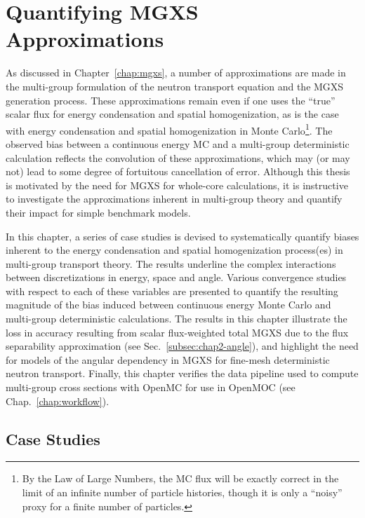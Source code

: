 \chapter{Quantifying MGXS Approximations}
\label{chap:biases}

As discussed in Chapter~\ref{chap:mgxs}, a number of approximations are made in the multi-group formulation of the neutron transport equation and the \ac{MGXS} generation process. These approximations remain even if one uses the ``true'' scalar flux for energy condensation and spatial homogenization, as is the case with energy condensation and spatial homogenization in Monte Carlo\footnote{By the Law of Large Numbers, the \ac{MC} flux will be exactly correct in the limit of an infinite number of particle histories, though it is only a ``noisy'' proxy for a finite number of particles.}. The observed bias between a continuous energy \ac{MC} and a multi-group deterministic calculation reflects the convolution of these approximations, which may (or may not) lead to some degree of fortuitous cancellation of error. Although this thesis is motivated by the need for \ac{MGXS} for whole-core calculations, it is instructive to investigate the approximations inherent in multi-group theory and quantify their impact for simple benchmark models.

In this chapter, a series of case studies is devised to systematically quantify biases inherent to the energy condensation and spatial homogenization process(es) in multi-group transport theory. The results underline the complex interactions between discretizations in energy, space and angle. Various convergence studies with respect to each of these variables are presented to quantify the resulting magnitude of the bias induced between continuous energy Monte Carlo and multi-group deterministic calculations. The results in this chapter illustrate the loss in accuracy resulting from scalar flux-weighted total \ac{MGXS} due to the flux separability approximation (see Sec.~\ref{subsec:chap2-angle}), and highlight the need for models of the angular dependency in \ac{MGXS} for fine-mesh deterministic neutron transport. Finally, this chapter verifies the data pipeline used to compute multi-group cross sections with OpenMC for use in OpenMOC (see Chap.~\ref{chap:workflow}).


\section{Case Studies}
\label{sec:chap5-case-studies}

